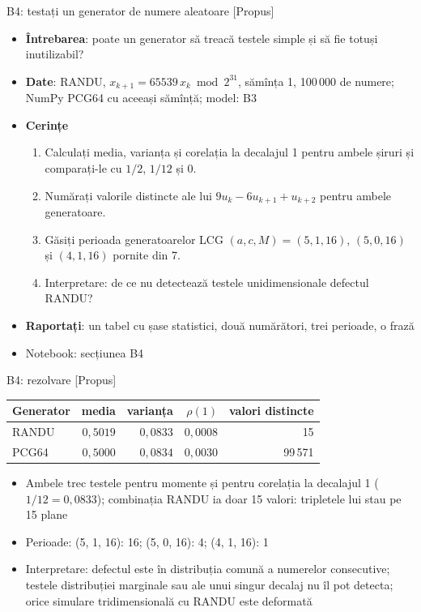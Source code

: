 \begin{frame}{B4: testați un generator de numere aleatoare [Propus]}
\itemsize{\footnotesize}
\begin{itemize}
\item \textbf{Întrebarea}: poate un generator să treacă testele simple și să fie totuși inutilizabil?
\item \textbf{Date}: RANDU, $x_{k+1} = 65539\,x_k \bmod 2^{31}$, sămînța 1, 100\,000 de numere; NumPy PCG64 cu aceeași sămînță; model: B3
\item \textbf{Cerințe}
\begin{enumerate}
    \item Calculați media, varianța și corelația la decalajul 1 pentru ambele șiruri și comparați-le cu $1/2$, $1/12$ și 0.
    \item Numărați valorile distincte ale lui $9u_k - 6u_{k+1} + u_{k+2}$ pentru ambele generatoare.
    \item Găsiți perioada generatoarelor LCG $(a, c, M) = (5, 1, 16)$, $(5, 0, 16)$ și $(4, 1, 16)$ pornite din 7.
    \item Interpretare: de ce nu detectează testele unidimensionale defectul RANDU?
\end{enumerate}
\item \textbf{Raportați}: un tabel cu șase statistici, două numărători, trei perioade, o frază
\item Notebook: secțiunea B4
\end{itemize}
\end{frame}

\ifsolutions
\begin{frame}{B4: rezolvare [Propus]}
\itemsize{\footnotesize}
\begin{center}
\footnotesize
\begin{tabular}{lrrrr}
\toprule
Generator & media & varianța & $\rho(1)$ & valori distincte \\
\midrule
RANDU & $0{,}5019$ & $0{,}0833$ & $0{,}0008$ & 15 \\
PCG64 & $0{,}5000$ & $0{,}0834$ & $0{,}0030$ & 99\,571 \\
\bottomrule
\end{tabular}
\end{center}
\begin{itemize}
    \item Ambele trec testele pentru momente și pentru corelația la decalajul 1 ($1/12 = 0{,}0833$); combinația RANDU ia doar 15 valori: tripletele lui stau pe 15 plane
    \item Perioade: (5, 1, 16): 16; (5, 0, 16): 4; (4, 1, 16): 1
    \item Interpretare: defectul este în distribuția comună a numerelor consecutive; testele distribuției marginale sau ale unui singur decalaj nu îl pot detecta; orice simulare tridimensională cu RANDU este deformată
\end{itemize}
\end{frame}
\fi

